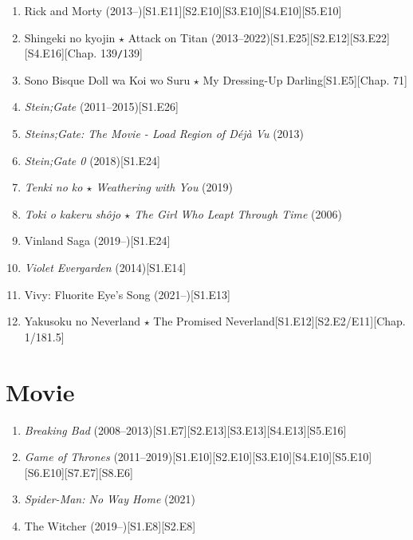 \documentclass{article}
\begin{document}
\begin{enumerate}
    Rascal Does Not Dream of Bunny Girl Senpai (2018--)\hfill[S1.E14]
    \item Rick and Morty (2013--)\hfill[S1.E11][S2.E10][S3.E10][S4.E10][S5.E10]
    \item Shingeki no kyojin $\star$ Attack on Titan (2013--2022)\hfill[S1.E25][S2.E12][S3.E22][S4.E16][Chap. 139\texttt{/}139]
    \item Sono Bisque Doll wa Koi wo Suru $\star$ My Dressing-Up Darling\hfill[S1.E5][Chap. 71]
    \item \textit{Stein;Gate} (2011--2015)\hfill[S1.E26]
    \item \textit{Steins;Gate: The Movie - Load Region of Déjà Vu} (2013)
    \item \textit{Stein;Gate 0} (2018)\hfill[S1.E24]
    \item \textit{Tenki no ko $\star$ Weathering with You} (2019)
    \item \textit{Toki o kakeru sh\^ojo $\star$ The Girl Who Leapt Through Time} (2006)
    \item Vinland Saga (2019--)\hfill[S1.E24]
    \item \textit{Violet Evergarden} (2014)\hfill[S1.E14]
    \item Vivy: Fluorite Eye's Song (2021--)\hfill[S1.E13]
    \item Yakusoku no Neverland $\star$ The Promised Neverland\hfill[S1.E12][S2.E2/E11][Chap. 1/181.5]
\end{enumerate}


\section{Movie}
\begin{enumerate}
	\item \textit{Breaking Bad} (2008--2013)\hfill[S1.E7][S2.E13][S3.E13][S4.E13][S5.E16]
	\item \textit{Game of Thrones} (2011--2019)\hfill[S1.E10][S2.E10][S3.E10][S4.E10][S5.E10][S6.E10][S7.E7][S8.E6]
	\item \textit{Spider-Man: No Way Home} (2021)
	\item The Witcher (2019--)\hfill[S1.E8][S2.E8]
\end{enumerate}
\end{document}
